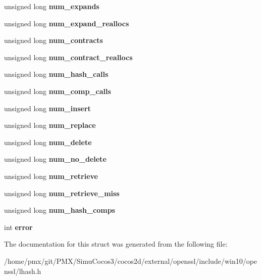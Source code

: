 \begin{DoxyCompactItemize}
$$unsigned long {\bfseries num\+\_\+expands}
\item 
\mbox{\label{structlhash__st_aee3cddefee8066c630b4b1b82ca20b58}} 
unsigned long {\bfseries num\+\_\+expand\+\_\+reallocs}
\item 
\mbox{\label{structlhash__st_a592f4a9b45f36180109df1e6dad0dfc2}} 
unsigned long {\bfseries num\+\_\+contracts}
\item 
\mbox{\label{structlhash__st_a0f1b2c724564a9bbc3d5b847dd570215}} 
unsigned long {\bfseries num\+\_\+contract\+\_\+reallocs}
\item 
\mbox{\label{structlhash__st_ad268b6d624e386a9cb2d151cf40faee0}} 
unsigned long {\bfseries num\+\_\+hash\+\_\+calls}
\item 
\mbox{\label{structlhash__st_ae1b31884e484b59f563c6f81a4fa7d8a}} 
unsigned long {\bfseries num\+\_\+comp\+\_\+calls}
\item 
\mbox{\label{structlhash__st_ada8ae86f682c0925b9f2b50975262017}} 
unsigned long {\bfseries num\+\_\+insert}
\item 
\mbox{\label{structlhash__st_a6c301e9b9ec8e09f4bb6882d77f1757e}} 
unsigned long {\bfseries num\+\_\+replace}
\item 
\mbox{\label{structlhash__st_aefe2bc9e1e050fbb114b26c31fca0879}} 
unsigned long {\bfseries num\+\_\+delete}
\item 
\mbox{\label{structlhash__st_a54547ec18c8eb65436be64ed20981d30}} 
unsigned long {\bfseries num\+\_\+no\+\_\+delete}
\item 
\mbox{\label{structlhash__st_a82b26dec352a27b9b886c305765c665f}} 
unsigned long {\bfseries num\+\_\+retrieve}
\item 
\mbox{\label{structlhash__st_a387e6db76e41d95cdcdb97a518eda2a8}} 
unsigned long {\bfseries num\+\_\+retrieve\+\_\+miss}
\item 
\mbox{\label{structlhash__st_a9e918c731a184cab5fa9a7919b3633c4}} 
unsigned long {\bfseries num\+\_\+hash\+\_\+comps}
\item 
\mbox{\label{structlhash__st_aec4f09d46d46d5734bc1d66706533ed3}} 
int {\bfseries error}
\end{DoxyCompactItemize}


The documentation for this struct was generated from the following file\+:\begin{DoxyCompactItemize}
\item 
/home/pmx/git/\+P\+M\+X/\+Simu\+Cocos3/cocos2d/external/openssl/include/win10/openssl/lhash.\+h\end{DoxyCompactItemize}
